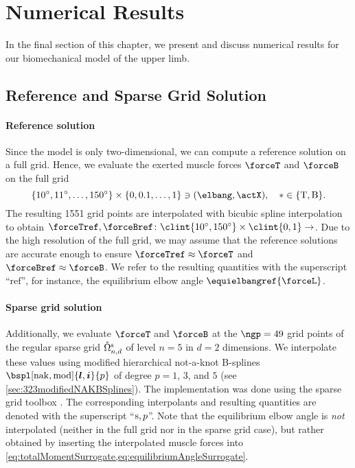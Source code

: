 \section{Numerical Results}
\label{sec:73results}


\noindent
In the final section of this chapter,
we present and discuss numerical results for our
biomechanical model of the upper limb.



\subsection{Reference and Sparse Grid Solution}
\label{sec:731solutionTypes}

\paragraph{Reference solution}

Since the model is only two-dimensional, we can compute a reference solution
on a full grid.
Hence, we evaluate the exerted muscle forces $\forceT$ and $\forceB$ on
the full grid
\begin{equation}
  \{\ang{10}, \ang{11}, \dotsc, \ang{150}\} \times \{0, 0.1, \dotsc, 1\}
  \ni (\elbang, \actX),\quad
  {\ast} \in \{\mathrm{T}, \mathrm{B}\}.
\end{equation}
The resulting \num{1551} grid points
are interpolated with bicubic spline interpolation
to obtain 
$\forceTref, \forceBref\colon
\clint{\ang{10}, \ang{150}} \times \clint{0, 1} \to \real$.
Due to the high resolution of the full grid,
we may assume that the reference solutions are accurate enough
to ensure $\forceTref \approx \forceT$ and $\forceBref \approx \forceB$.
We refer to the resulting quantities with the superscript ``$\mathrm{ref}$'',
for instance, the equilibrium elbow angle $\equielbangref{\forceL}$.

\paragraph{Sparse grid solution}

Additionally, we evaluate $\forceT$ and $\forceB$ at the $\ngp = 49$
grid points of the regular sparse grid $\interiorregsgset{n}{d}$ of
level $n = 5$ in $d = 2$ dimensions.
We interpolate these values using
modified hierarchical not-a-knot B-splines
$\bspl[\nak,\modified]{\*l,\*i}{p}$ of degree $p = 1$, $3$, and $5$
(see \cref{sec:323modifiedNAKBSplines}).
The implementation was done using the sparse grid toolbox
\sgpp{} \cite{Pflueger10Spatially}.
The corresponding interpolants and resulting quantities
are denoted with the superscript ``$\mathrm{s},p$''.
Note that the equilibrium elbow angle is \emph{not} interpolated
(neither in the full grid nor in the sparse grid case),
but rather obtained by inserting the interpolated muscle forces
into \cref{eq:totalMomentSurrogate,eq:equilibriumAngleSurrogate}.



